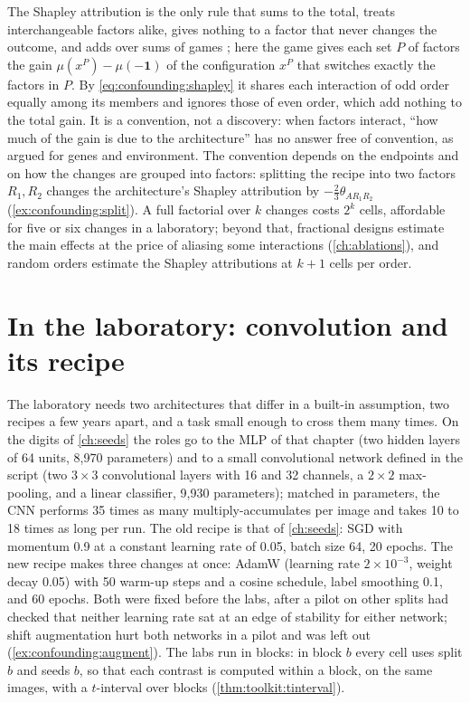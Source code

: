 \begin{refsection}
The Shapley attribution is the only rule that sums to the total, treats interchangeable factors alike, gives nothing to a factor that never changes the outcome, and adds over sums of games \parencite{Shapley1953}; here the game gives each set $P$ of factors the gain $\mu(x^P)-\mu(-\mathbf 1)$ of the configuration $x^P$ that switches exactly the factors in $P$. By \eqref{eq:confounding:shapley} it shares each interaction of odd order equally among its members and ignores those of even order, which add nothing to the total gain. It is a convention, not a discovery: when factors interact, \enquote{how much of the gain is due to the architecture} has no answer free of convention, as \textcite{Lewontin1974} argued for genes and environment. The convention depends on the endpoints and on how the changes are grouped into factors: splitting the recipe into two factors $R_1,R_2$ changes the architecture's Shapley attribution by $-\frac23\theta_{AR_1R_2}$ (\cref{ex:confounding:split}). A full factorial over $k$ changes costs $2^k$ cells, affordable for five or six changes in a laboratory; beyond that, fractional designs estimate the main effects at the price of aliasing some interactions (\cref{ch:ablations}), and random orders estimate the Shapley attributions at $k+1$ cells per order.

\section{In the laboratory: convolution and its recipe}\label{sec:confounding:lab}

The laboratory needs two architectures that differ in a built-in assumption, two recipes a few years apart, and a task small enough to cross them many times. On the digits of \cref{ch:seeds} the roles go to the MLP of that chapter (two hidden layers of 64 units, 8,970 parameters) and to a small convolutional network defined in the script (two $3\times3$ convolutional layers with 16 and 32 channels, a $2\times2$ max-pooling, and a linear classifier, 9,930 parameters); matched in parameters, the CNN performs 35 times as many multiply-accumulates per image and takes 10 to 18 times as long per run. The old recipe is that of \cref{ch:seeds}: SGD with momentum 0.9 at a constant learning rate of 0.05, batch size 64, 20 epochs. The new recipe makes three changes at once: AdamW (learning rate $2\times10^{-3}$, weight decay 0.05) with 50 warm-up steps and a cosine schedule, label smoothing 0.1, and 60 epochs. Both were fixed before the labs, after a pilot on other splits had checked that neither learning rate sat at an edge of stability for either network; shift augmentation hurt both networks in a pilot and was left out (\cref{ex:confounding:augment}). The labs run in blocks: in block $b$ every cell uses split $b$ and seeds $b$, so that each contrast is computed within a block, on the same images, with a $t$-interval over blocks (\cref{thm:toolkit:tinterval}).


\end{refsection}
